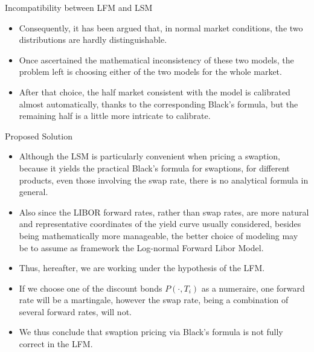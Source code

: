 \documentclass{beamer}
\begin{document}
\begin{frame}{Incompatibility between LFM and LSM}
	\begin{itemize}
		\item<1-> Consequently, it has been argued that, in normal market conditions, the two distributions are hardly distinguishable.
		\item<2-> Once ascertained the mathematical inconsistency of these two models, the problem left is choosing either of the two models for the whole market.
		\item<3-> After that choice, the half market consistent with the model is calibrated almost automatically, thanks to the corresponding Black’s formula, but the remaining half is a little more intricate to calibrate.
	\end{itemize}
\end{frame}

\begin{frame}{Proposed Solution}
	\begin{itemize}
		\item<1-> Although the LSM is particularly convenient when pricing a swaption, because it yields the practical Black’s formula for swaptions, for different products, even those involving the swap rate, there is no analytical formula in general.
		\item<2-> \textcolor{maincolor}{Also since the LIBOR forward rates, rather than swap rates, are more natural and representative coordinates of the yield curve usually considered}, besides being mathematically more manageable, the better choice of modeling may be to \textcolor{maincolor}{assume as framework the Log-normal Forward Libor Model}.
		\item<3-> Thus, hereafter, we are working under the hypothesis of the LFM.
		\item<4-> If we choose one of the discount bonds $P(\cdot, T_i)$ as a numeraire, one forward rate will be a martingale, however the swap rate, being a combination of several forward rates, will not.
		\item<5-> We thus conclude that \textcolor{maincolor}{swaption pricing via Black’s formula is not fully correct in the LFM}.
	\end{itemize}
\end{frame}
\end{document}
